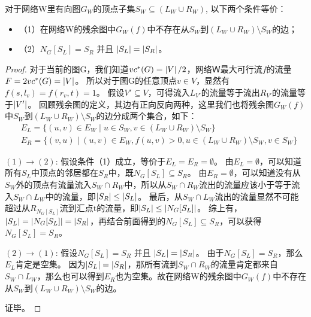 \begin{lemma} \label{residualgraph1}
对于网络W里有向图$G_W$的顶点子集$S_W \subseteq (L_W \cup R_W)$, 以下两个条件等价：
\begin{itemize}
  \item {（1）}在网络W的残余图中$G_W(f)$中不存在从$S_W$到$(L_W \cup R_W) \setminus S_W$的边；
  \item {（2）}$N_G[S_L] = S_R$ 并且 $\left\vert S_L \right\vert = \left\vert S_R \right\vert$。
\end{itemize}


\end{lemma}
\begin{proof}
  对于当前的图G，我们知道$vc^*(G) = \left\vert V \right\vert / 2$，网络Ｗ最大可行流$f$的流量$F=2vc^*(G)=\left\vert V \right\vert$。
  所以对于图G的任意顶点$v \in V$，显然有$f(s, l_v) = f(r_v, t) = 1$。
  假设$V' \subseteq V$，可得流入$L_{V'}$的流量等于流出$R_{V'}$的流量等于$\left\vert V' \right\vert$。
  回顾残余图的定义，其边有正向反向两种，这里我们也将残余图$G_W(f)$中$S_W$到$(L_W \cup R_W) \setminus S_W$的边分成两个集合，如下：
  \begin{equation*} \begin{aligned}
    & E_L = \{(u, v) \in E_W\;|\;u \in S_W,v \in (L_W \cup R_W) \setminus S_W\} \\
    & E_R = \{(v, u)\;|\;(u, v) \in E_W,f(u, v) > 0,u \in (L_W \cup R_W) \setminus S_W,v \in S_W\}
  \end{aligned} \end{equation*}


  $(1)\rightarrow (2)$: 假设条件（1）成立，等价于$E_L = E_R = \emptyset$。
  由$E_L = \emptyset$，可以知道所有$S_L$中顶点的邻居都在$S_R$中，既$N_G[S_L] \subseteq S_R$。
  由$E_R = \emptyset$，可以知道没有从$S_W$外的顶点有流量流入$S_W \cap R_W$中，所以从$S_W \cap R_W$流出的流量应该小于等于流入$S_W \cap L_W$中的流量，即$\left\vert S_R \right\vert \le \left\vert S_L \right\vert$。
  最后，从$S_W \cap L_W$流出的流量显然不可能超过从$R_{N_G[S_L]}$流到汇点t的流量，即$\left\vert S_L \right\vert \le \left\vert N_G[S_L] \right\vert$。
  综上有，$\left\vert S_L \right\vert = \left\vert N_G[S_L] \right\vert = \left\vert S_R \right\vert$，再结合前面得到的$N_G[S_L] \subseteq S_R$，可以获得$N_G[S_L] = S_R$。

  $(2)\rightarrow (1)$: 假设$N_G[S_L] = S_R$ 并且 $\left\vert S_L \right\vert = \left\vert S_R \right\vert$。
  由于$N_G[S_L] = S_R$，那么$E_L$肯定是空集。
  因为$\left\vert S_L \right\vert = \left\vert S_R \right\vert$，那所有流到$S_W \cap R_W$的流量肯定都来自$S_W \cap L_W$，那么也可以得到$E_R$也为空集。故在网络W的残余图中$G_W(f)$中不存在从$S_W$到$(L_W \cup R_W) \setminus S_W$的边。

  证毕。
\end{proof}

